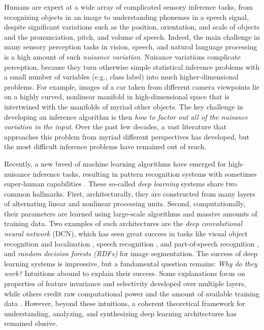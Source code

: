 \documentclass[12pt]{article}
\begin{document}
Humans are expert at a wide array of complicated sensory inference tasks, from recognizing objects in an image to understanding phonemes in a speech signal, despite significant variations such as the position, orientation, and scale of objects and the pronunciation, pitch, and volume of speech.
Indeed, the main challenge in many sensory perception tasks in vision, speech, and natural language processing is a high amount of such {\em nuisance variation}. 
Nuisance variations complicate perception, because they turn otherwise simple statistical inference problems with a small number of variables (e.g., class label) into much higher-dimensional problems.
For example, images of a car taken from different camera viewpoints lie on a highly curved, nonlinear manifold in high-dimensional space that is intertwined with the manifolds of myriad other objects.  
The key challenge in developing an inference algorithm is then \textit{how to factor out all of the nuisance variation in the input}. 
Over the past few decades, a vast literature that approaches this problem from myriad different perspectives has developed, but the most difficult inference problems have remained out of reach.

Recently, a new breed of machine learning algorithms have emerged for high-nuisance inference tasks, resulting in pattern recognition systems with sometimes super-human capabilities \cite{schmidhuber2015deep}.  
These so-called {\em deep learning} systems share two common hallmarks. 
First, architecturally, they are constructed from many layers of alternating linear and nonlinear processing units.
Second, computationally, their parameters are learned using large-scale algorithms and massive amounts of training data. 
Two examples of such architectures are the {\em deep convolutional neural network} (DCN), which has seen great success in tasks like visual object recognition and localization \cite{zeiler2014visualizing}, speech recognition \cite{hannun2014deepspeech}, and part-of-speech recognition \cite{Schmid:1994:PTN:991886.991915}, and  {\em random decision forests (RDFs)} \cite{criminisi2013decision} for image segmentation. 
The success of deep learning systems is impressive, but a fundamental question remains: {\em Why do they work?} 
Intuitions abound to explain their success. Some explanations focus on properties of feature invariance and selectivity developed over multiple layers, while others credit raw computational power and the amount of available training data \cite{schmidhuber2015deep}. 
However, beyond these intuitions, a coherent theoretical framework for understanding, analyzing, and synthesizing deep learning architectures has remained elusive. 
\end{document}
